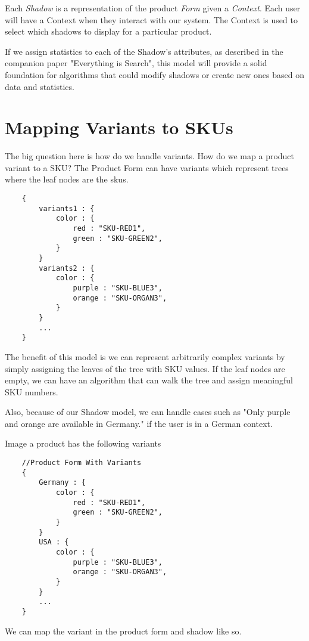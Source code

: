 \documentclass[11pt]{article}
\begin{document}
Each \emph{Shadow} is a representation of the product \emph{Form} given a \emph{Context}. Each user
will have a Context when they interact with our system. The Context is used
to select which shadows to display for a particular product.

If we assign statistics to each of the Shadow's attributes, as described in 
the companion paper "Everything is Search", this model will provide a solid
foundation for algorithms that could modify shadows or create new ones based on 
data and statistics.



\newpage
\section{Mapping Variants to SKUs}

The big question here is how do we handle variants. How do we map a product variant to a SKU? 
The Product Form can have variants which represent trees where the leaf nodes are
the skus.

\begin{lstlisting}
    {
        variants1 : {
            color : {
                red : "SKU-RED1",
                green : "SKU-GREEN2",
            }
        }
        variants2 : {
            color : {
                purple : "SKU-BLUE3",
                orange : "SKU-ORGAN3",
            }
        }
        ...
    }
\end{lstlisting}

The benefit of this model is we can represent arbitrarily complex variants 
by simply assigning the leaves of the tree with SKU values. If the leaf nodes are
empty, we can have an algorithm that can walk the tree and assign meaningful
SKU numbers.

Also, because of our Shadow model, we can handle cases such as "Only purple and orange
are available in Germany." if the user is in a German context. 

Image a product has the following variants

\begin{lstlisting}
    //Product Form With Variants
    {
        Germany : {
            color : {
                red : "SKU-RED1",
                green : "SKU-GREEN2",
            }
        }
        USA : {
            color : {
                purple : "SKU-BLUE3",
                orange : "SKU-ORGAN3",
            }
        }
        ...
    }
\end{lstlisting}
We can map the variant in the product form and shadow like so.
\end{document}
